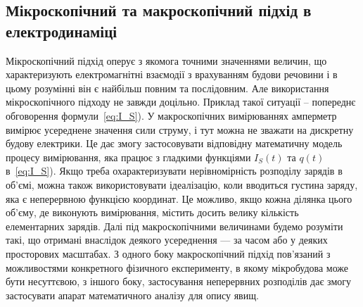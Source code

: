 \begin{SCfigure}[1][h!]
    \centering
\caption{}
\label{tikz:current}
\end{SCfigure}


\subsection*{Мікроскопічний та макроскопічний підхід в електродинаміці}



Мікроскопічний підхід оперує з якомога точними значеннями величин, що характеризують електромагнітні взаємодії з врахуванням будови речовини і в цьому
розумінні він є найбільш повним та послідовним. Але використання мікроскопічного підходу не завжди доцільно. Приклад такої ситуації – попереднє
обговорення формули~\eqref{eq:I_S}). У макроскопічних вимірюваннях амперметр вимірює усереднене значення сили струму, і тут можна не зважати на
дискретну будову електрики. Це дає змогу застосовувати відповідну математичну модель процесу вимірювання, яка працює з гладкими функціями $I_S(t)$ та
$q(t)$ в~\eqref{eq:I_S}). Якщо треба охарактеризувати нерівномірність розподілу зарядів в об’ємі, можна також використовувати ідеалізацію, коли
вводиться густина заряду, яка є неперервною функцією координат. Це можливо, якщо кожна ділянка цього об’єму, де виконують вимірювання, містить досить
велику кількість елементарних зарядів. Далі під макроскопічними величинами будемо розуміти такі, що отримані внаслідок деякого усереднення --- за часом
або у деяких просторових масштабах. З одного боку макроскопічний підхід пов’язаний з можливостями конкретного фізичного експерименту, в якому
мікробудова може бути несуттєвою, з іншого боку, застосування неперервних розподілів дає змогу застосувати апарат математичного аналізу для опису явищ.



